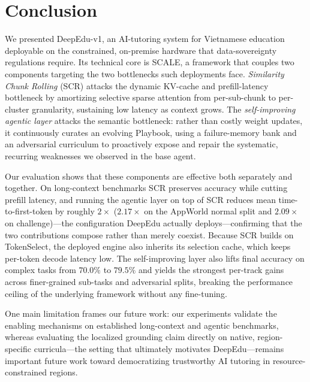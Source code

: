 \documentclass[10pt,conference]{IEEEtran}
\begin{document}
\section{Conclusion}
\label{sec:conclusion}
We presented DeepEdu-v1, an AI-tutoring system for Vietnamese education
deployable on the constrained, on-premise hardware that data-sovereignty
regulations require. Its technical core is SCALE, a framework that couples
two components targeting the two bottlenecks such deployments face. \emph{Similarity Chunk Rolling} (SCR) attacks the
dynamic KV-cache and prefill-latency bottleneck by amortizing selective
sparse attention from per-sub-chunk to per-cluster granularity, sustaining
low latency as context grows. The \emph{self-improving agentic layer}
attacks the semantic bottleneck: rather than costly weight updates, it
continuously curates an evolving Playbook, using a failure-memory bank and
an adversarial curriculum to proactively expose and repair the systematic,
recurring weaknesses we observed in the base agent.

Our evaluation shows that these components are effective both separately
and together. On long-context benchmarks SCR preserves accuracy while
cutting prefill latency, and running the agentic layer on top of SCR
reduces mean time-to-first-token by roughly $2\times$ ($2.17\times$ on the
AppWorld normal split and $2.09\times$ on challenge)---the configuration
DeepEdu actually deploys---confirming that the two contributions compose
rather than merely coexist. Because SCR builds on TokenSelect, the
deployed engine also inherits its selection cache, which keeps per-token
decode latency low. The self-improving layer also lifts final accuracy on
complex tasks from $70.0\%$ to $79.5\%$ and yields the strongest
per-track gains across finer-grained sub-tasks and adversarial splits,
breaking the performance ceiling of the underlying framework without any
fine-tuning.

One main limitation frames our future work: our experiments validate the
enabling mechanisms on established long-context and agentic benchmarks,
whereas evaluating the localized grounding claim directly on native,
region-specific curricula---the setting that ultimately motivates
DeepEdu---remains important future work
toward democratizing trustworthy AI tutoring in resource-constrained
regions.


\end{document}
